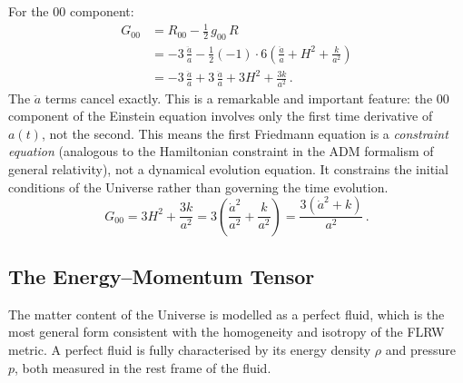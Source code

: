 For the $00$ component:
\begin{align}
    G_{00} &= R_{00} - \frac{1}{2}\,g_{00}\,R \nonumber\\[4pt]
           &= -3\,\frac{\ddot{a}}{a} - \frac{1}{2}(-1)\cdot 6\!\left(\frac{\ddot{a}}{a}+H^2+\frac{k}{a^2}\right) \nonumber\\[4pt]
           &= -3\,\frac{\ddot{a}}{a} + 3\,\frac{\ddot{a}}{a} + 3H^2 + \frac{3k}{a^2}\,.
\end{align}
The $\ddot{a}$ terms cancel exactly. This is a remarkable and important feature: the $00$ component of the Einstein equation involves only the first time derivative of $a(t)$, not the second. This means the first Friedmann equation is a \emph{constraint equation} (analogous to the Hamiltonian constraint in the ADM formalism of general relativity), not a dynamical evolution equation. It constrains the initial conditions of the Universe rather than governing the time evolution.
\begin{equation}
\boxed{G_{00} = 3H^2 + \frac{3k}{a^2} = 3\!\left(\frac{\dot{a}^2}{a^2}+\frac{k}{a^2}\right) = \frac{3(\dot{a}^2+k)}{a^2}\,.}
\end{equation}

\subsection{The Energy--Momentum Tensor}

The matter content of the Universe is modelled as a perfect fluid, which is the most general form consistent with the homogeneity and isotropy of the FLRW metric. A perfect fluid is fully characterised by its energy density $\rho$ and pressure $p$, both measured in the rest frame of the fluid. 


